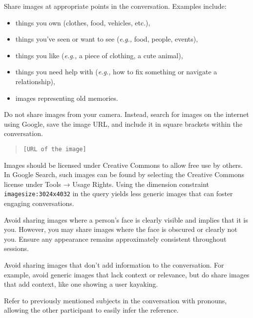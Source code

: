 \begin{tcolorbox}[title=Chat Guidelines for Participants, myboxstyle, breakable, before skip=0pt]
\begin{description}[align=left, labelwidth=5em, labelindent=0em, itemsep=1em]
    \item[\textbf{Images.}]
    Share images at appropriate points in the conversation. Examples include:
    \begin{itemize}
        \item things you own (clothes, food, vehicles, etc.),
        \item things you've seen or want to see (\textit{e.g.,} food, people, events),
        \item things you like (\textit{e.g.,} a piece of clothing, a cute animal),
        \item things you need help with (\textit{e.g.,} how to fix something or navigate a relationship),
        \item images representing old memories.
    \end{itemize}

    \item[\textbf{Image Source.}]
    Do not share images from your camera. Instead, search for images on the internet using Google, save the image URL, and include it in square brackets within the conversation.
    \begin{quote}
        \texttt{[URL of the image]}
    \end{quote}
    Images should be licensed under Creative Commons to allow free use by others. In Google Search, such images can be found by selecting the Creative Commons license under Tools → Usage Rights. Using the dimension constraint \texttt{imagesize:3024x4032} in the query yields less generic images that can foster engaging conversations.

    \item[\textbf{Images Containing Faces.}]
    Avoid sharing images where a person's face is clearly visible and implies that it is you. However, you may share images where the face is obscured or clearly not you. Ensure any appearance remains approximately consistent throughout sessions.

    \item[\textbf{Image Context.}]
    Avoid sharing images that don’t add information to the conversation. For example, avoid generic images that lack context or relevance, but do share images that add context, like one showing a user kayaking.

    \item[\textbf{Pronoun Use.}]
    Refer to previously mentioned subjects in the conversation with pronouns, allowing the other participant to easily infer the reference.
\end{description}
\end{tcolorbox}

